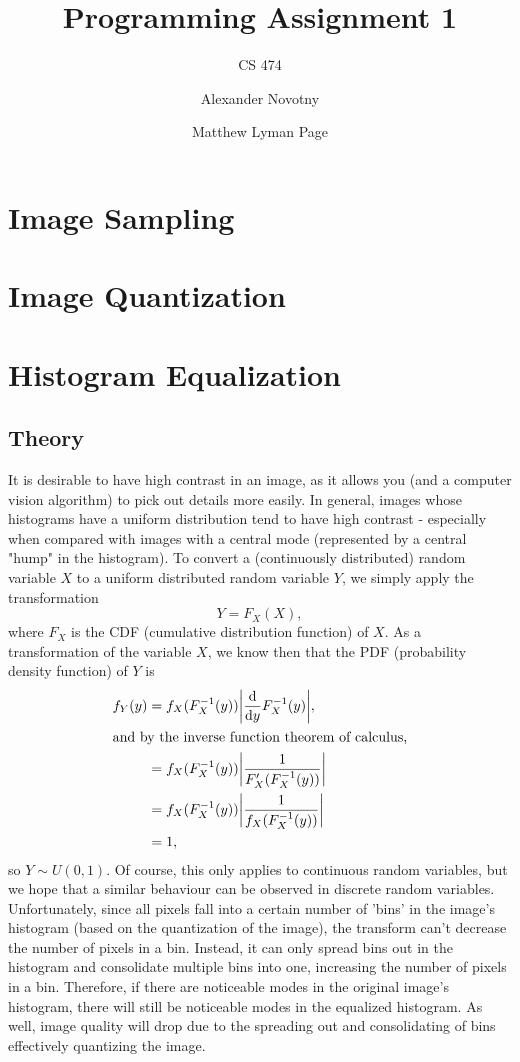 \documentclass[headings=optiontoheadandtoc,listof=totoc]{scrartcl}
\title{Programming Assignment 1}
\subtitle{CS 474}
\author{Alexander Novotny \and Matthew Lyman Page}
\begin{document}
\maketitle
\tableofcontents

\newpage

\section{Image Sampling}

\section{Image Quantization}

\section{Histogram Equalization}

\subsection{Theory}
\label{sec:equalization-theory}
It is desirable to have high contrast in an image, as it allows you (and a computer vision algorithm) to pick out details more easily. In general, images whose histograms have a uniform distribution tend to have high contrast - especially when compared with images with a central mode (represented by a central "hump" in the histogram). To convert a (continuously distributed) random variable $X$ to a uniform distributed random variable $Y$, we simply apply the transformation \[Y = F_X(X),\] where $F_X$ is the CDF (cumulative distribution function) of $X$. As a transformation of the variable $X$, we know then that the PDF (probability density function) of $Y$ is
\begin{align*}
	f_Y(y) &= f_X(F_X^{-1}(y)) \abs{\dv{y} F_X^{-1}(y)},\\
\shortintertext{and by the inverse function theorem of calculus,}
		&= f_X(F_X^{-1}(y)) \abs{\frac{1}{F_X'(F_X^{-1}(y))}}\\
		&= f_X(F_X^{-1}(y)) \abs{\frac{1}{f_X(F_X^{-1}(y))}}\\
		&= 1,
\end{align*}
so $Y \sim U(0, 1)$. Of course, this only applies to continuous random variables, but we hope that a similar behaviour can be observed in discrete random variables. Unfortunately, since all pixels fall into a certain number of 'bins' in the image's histogram (based on the quantization of the image), the transform can't decrease the number of pixels in a bin. Instead, it can only spread bins out in the histogram and consolidate multiple bins into one, increasing the number of pixels in a bin. Therefore, if there are noticeable modes in the original image's histogram, there will still be noticeable modes in the equalized histogram. As well, image quality will drop due to the spreading out and consolidating of bins effectively quantizing the image.
\end{document}
